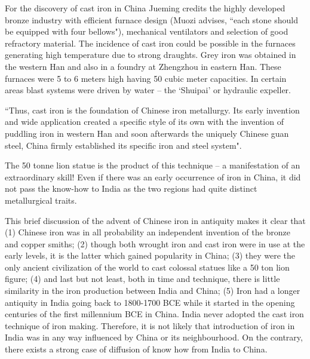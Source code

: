 For the discovery of cast iron in China Jueming credits the highly developed bronze industry with efficient furnace design (Muozi advises, ``each stone should be equipped with four bellows"), mechanical ventilators and selection of good refractory material. The incidence of cast iron could be possible in the furnaces generating high temperature due to strong draughts. Grey iron was obtained in the western Han and also in a foundry at Zhengzhou in eastern Han. These furnaces were 5 to 6 meters high having 50 cubic meter capacities. In certain areas blast systems were driven by water – the `Shuipai' or hydraulic expeller.

{\footnotesize ``Thus, cast iron is the foundation of Chinese iron metallurgy. Its early invention and wide application created a specific style of its own with the invention of puddling iron in western Han and soon afterwards the uniquely Chinese guan steel, China firmly established its specific iron and steel system".}

The 50 tonne lion statue is the product of this technique – a manifestation of an extraordinary skill! Even if there was an early occurrence of iron in China, it did not pass the know-how to India as the two regions had quite distinct metallurgical traits.

\newpage

This brief discussion of the advent of Chinese iron in antiquity makes it clear that (1) Chinese iron was in all probability an independent invention of the bronze and copper smiths; (2) though both wrought iron and cast iron were in use at the early levels, it is the latter which gained popularity in China; (3) they were the only ancient civilization of the world to cast colossal statues like a 50 ton lion figure; (4) and last but not least, both in time and technique, there is little similarity in the iron production between India and China; (5) Iron had a longer antiquity in India going back to 1800-1700 BCE while it started in the opening centuries of the first millennium BCE in China. India never adopted the cast iron technique of iron making. Therefore, it is not likely that introduction of iron in India was in any way influenced by China or its neighbourhood. On the contrary, there exists a strong case of diffusion of know how from India to China. 

